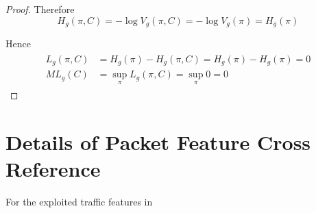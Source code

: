 \begin{proof}
	Therefore
	\begin{equation*}
		H_g(\pi, C) = -\log{V_g(\pi, C)} = -\log{V_g(\pi)} = H_g(\pi)
	\end{equation*}
	
	Hence 
	\begin{eqnarray*}
		\begin{aligned}
			L_g(\pi, C) &= H_g(\pi) - H_g(\pi,C) = H_g(\pi) - H_g(\pi) = 0\\
			ML_g(C) &= \sup_{\pi} L_g(\pi, C) = \sup_{\pi} 0 = 0
		\end{aligned}
	\end{eqnarray*}
\end{proof}



\chapter{Details of Packet Feature Cross Reference} \label{Detail Cross Reference}

For the exploited traffic features in 

